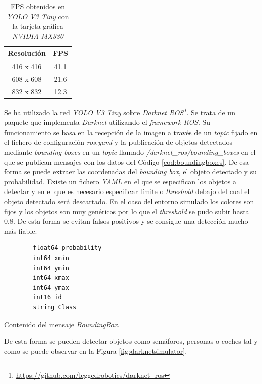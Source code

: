 \begin{table}[H]
	\begin{center}
		\begin{tabular}{|c|c|}
			\hline
			\textbf{Resolución} & \textbf{FPS}
			\\
			\hline
			416 x 416           & 41.1
			\\
			608 x 608           & 21.6
			\\
			832 x 832           & 12.3
			\\
			\hline
		\end{tabular}
		\caption{FPS obtenidos en \textit{YOLO V3 Tiny} con la tarjeta gráfica \textit{NVIDIA MX330}}
		\label{table:versusnotebook}
	\end{center}
\end{table}

Se ha utilizado la red \textit{YOLO V3 Tiny} sobre \textit{Darknet ROS\footnote{\url{https://github.com/leggedrobotics/darknet_ros}}}. Se trata de un paquete que implementa \textit{Darknet} utilizando el \textit{framework ROS}. Su funcionamiento se basa en la recepción de la imagen a través de un \textit{topic} fijado en el fichero de configuración \textit{ros.yaml} y la publicación de objetos detectados mediante \textit{bounding boxes} en un \textit{topic} llamado \textit{/darknet\_ros/bounding\_boxes} en el que se publican mensajes con los datos del Código \ref{cod:boundingboxes}. De esa forma se puede extraer las coordenadas del \textit{bounding box}, el objeto detectado y su probabilidad. Existe un fichero \textit{YAML} en el que se especifican los objetos a detectar y en el que es necesario especificar límite o \textit{threshold} debajo del cual el objeto detectado será descartado. En el caso del entorno simulado los colores son fijos y los objetos son muy genéricos por lo que el \textit{threshold} se pudo subir hasta 0.8. De esta forma se evitan falsos positivos y se consigue una detección mucho más fiable.\\

\begin{code}[h]
	\begin{lstlisting}
		float64 probability
		int64 xmin
		int64 ymin
		int64 xmax
		int64 ymax
		int16 id
		string Class
	\end{lstlisting}
	\caption[Contenido del mensaje \textit{BoundingBox}.]{Contenido del mensaje \textit{BoundingBox}.}
	\label{cod:boundingboxes}
\end{code}

De esta forma se pueden detectar objetos como semáforos, personas o coches tal y como se puede observar en la Figura \ref{fig:darknetsimulator}.\\


